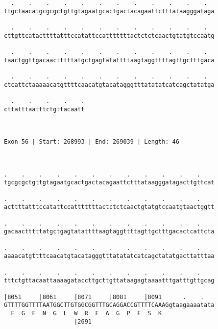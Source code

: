 \documentclass{article}
\begin{document}
\begin{Verbatim}
  .    .    .    .    .    .    .    .    .    .    .    .  
ttgctaacatgcgcgctgttgtagaatgcactgactacagaattctttataagggataga
                                                            
  .    .    .    .    .    .    .    .    .    .    .    .  
cttgttcatacttttatttccatattccatttttttactctctcaactgtatgtccaatg
                                                            
  .    .    .    .    .    .    .    .    .    .    .    .  
taactggttgacaactttttatgctgagtatattttaagtaggttttagttgctttgaca
                                                            
  .    .    .    .    .    .    .    .    .    .    .    .  
ctcattctaaaaacatgttttcaacatgtacatagggtttatatatcatcagctatatga
                                                            
  .    .    .    .    .
cttatttaatttctgttacaatt
                       
                       
 
Exon 56 | Start: 268993 | End: 269039 | Length: 46



.    .    .    .    .    .    .    .    .    .    .    .    
tgcgcgctgttgtagaatgcactgactacagaattctttataagggatagacttgttcat
                                                            
.    .    .    .    .    .    .    .    .    .    .    .    
acttttatttccatattccatttttttactctctcaactgtatgtccaatgtaactggtt
                                                            
.    .    .    .    .    .    .    .    .    .    .    .    
gacaactttttatgctgagtatattttaagtaggttttagttgctttgacactcattcta
                                                            
.    .    .    .    .    .    .    .    .    .    .    .    
aaaacatgttttcaacatgtacatagggtttatatatcatcagctatatgacttatttaa
                                                            
.    .    .    .    .    .    .    .    .    .    .    .    
tttctgttacaattaaaagataccttgcttgttataagagtaaaatttgatttgttgcag
                                                            
|8051     |8061     |8071     |8081     |8091      .    .   
GTTTTGGTTTTAATGGCTTGTGGCGGTTTGCAGGACCGTTTTCAAAGgtaagaaaatata
  F  G  F  N  G  L  W  R  F  A  G  P  F  S  K               
                    |2691                                   
  

\end{Verbatim}
\end{document}

